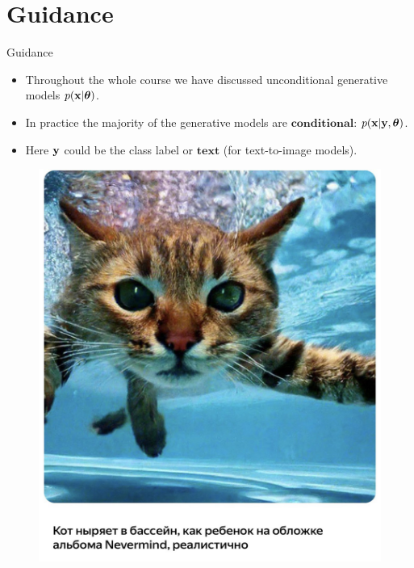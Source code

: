 \section{Guidance}
\begin{frame}{Guidance}
	\begin{itemize}
	\item Throughout the whole course we have discussed unconditional generative models $p(\mathbf{x} | \boldsymbol{\theta})$.
	\item In practice the majority of the generative models are $\textbf{conditional}$: $p(\mathbf{x} | \mathbf{y}, \boldsymbol{\theta})$.
	\item Here $\mathbf{y}$ could be the class label or $\textbf{text}$ (for text-to-image models).
	\end{itemize}
	\vspace{-0.3cm}
	\begin{minipage}[t]{0.5\columnwidth}
		\begin{figure}
			\includegraphics[width=0.9\linewidth]{figs/shedevrum1}
		\end{figure}
	\end{minipage}%
	\begin{minipage}[t]{0.5\columnwidth}
		\begin{figure}

\end{figure}
\end{minipage}
\end{frame}
